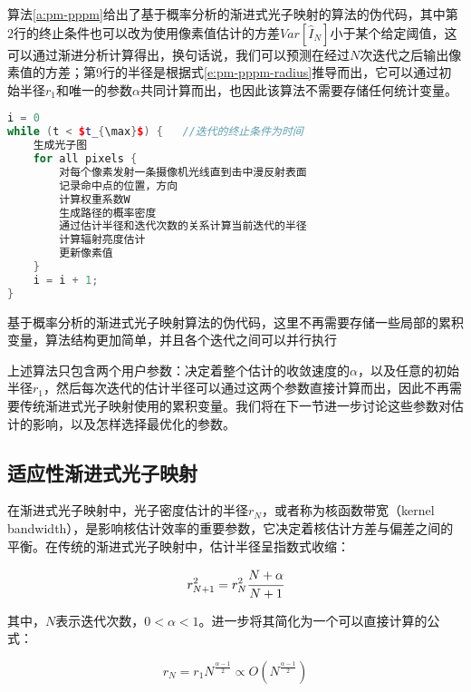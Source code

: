 算法\ref{a:pm-pppm}给出了基于概率分析的渐进式光子映射的算法的伪代码，其中第2行的终止条件也可以改为使用像素值估计的方差$Var[\hat{I}_N]$小于某个给定阈值，这可以通过渐进分析计算得出，换句话说，我们可以预测在经过$N$次迭代之后输出像素值的方差；第9行的半径是根据式\ref{e:pm-pppm-radius}推导而出，它可以通过初始半径$r_1$和唯一的参数$\alpha$共同计算而出，也因此该算法不需要存储任何统计变量。

\begin{algorithm}
\begin{lstlisting}[language=C++,mathescape]
i = 0
while (t < $t_{\max}$) {   //迭代的终止条件为时间
	生成光子图
	for all pixels {
		对每个像素发射一条摄像机光线直到击中漫反射表面
		记录命中点的位置，方向
		计算权重系数W
		生成路径的概率密度
		通过估计半径和迭代次数的关系计算当前迭代的半径
		计算辐射亮度估计
		更新像素值  
	}
	i = i + 1;
}
\end{lstlisting}	
\caption{基于概率分析的渐进式光子映射算法的伪代码，这里不再需要存储一些局部的累积变量，算法结构更加简单，并且各个迭代之间可以并行执行}
\label{a:pm-pppm}
\end{algorithm}

上述算法只包含两个用户参数：决定着整个估计的收敛速度的$\alpha$，以及任意的初始半径$r_1$，然后每次迭代的估计半径可以通过这两个参数直接计算而出，因此不再需要传统渐进式光子映射使用的累积变量。我们将在下一节进一步讨论这些参数对估计的影响，以及怎样选择最优化的参数。





\subsection{适应性渐进式光子映射}\label{sec:pm-adaptive-ppm}
在渐进式光子映射中，光子密度估计的半径$r_N$，或者称为核函数带宽（kernel bandwidth），是影响核估计效率的重要参数，它决定着核估计方差与偏差之间的平衡。在传统的渐进式光子映射\cite{a:ProgressivePhotonMapping,a:ProgressivePhotonMappingAProbabilisticApproach}中，估计半径呈指数式收缩：

\begin{equation}
	r^{2}_{N+1}=r^{2}_{N} \cfrac{N+\alpha}{N+1}
\end{equation}

其中，$N$表示迭代次数，$0<\alpha<1$。\cite{a:AdaptiveProgressivePhotonMapping}进一步将其简化为一个可以直接计算的公式：

\begin{equation}\label{e:pm-radius}
	r_N=r_{1}N^{ \frac{\alpha-1}{2}}\propto O(N^{ \frac{\alpha-1}{2}})
\end{equation}

